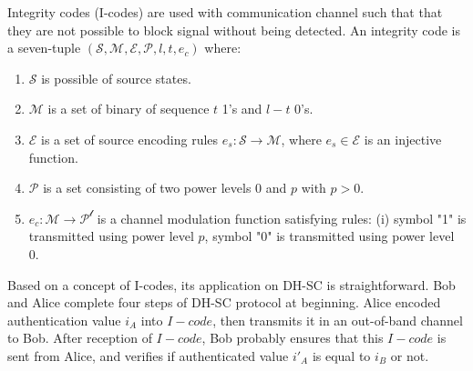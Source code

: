 Integrity codes (I-codes) are used with communication channel such that that they are not possible to block signal without being detected. An integrity code is a seven-tuple $(\mathcal{S},\mathcal{M},\mathcal{E},\mathcal{P},l,t,e_c)$ where:
\begin{enumerate}
\item $\mathcal{S}$ is possible of source states. 
\item $\mathcal{M}$ is a set of binary of sequence $t$ 1's and $l-t$ 0's. 
\item $\mathcal{E}$ is a set of source encoding rules $e_s: \mathcal{S} \rightarrow \mathcal{M}$, where $e_s \in \mathcal{E}$ is an injective function. 
\item $\mathcal{P}$ is a set consisting of two power levels 0 and $p$ with $p > 0$.
\item $e_c:\mathcal{M} \rightarrow \mathcal{P^l}$ is a channel modulation function satisfying rules: (i) symbol "1" is transmitted using power level $p$, symbol "0" is transmitted using power level 0. 
\end{enumerate} 

Based on a concept of I-codes, its application on DH-SC is straightforward. Bob and Alice complete four steps of DH-SC protocol at beginning. Alice encoded authentication value $i_A$ into $I-code$, then transmits it in an out-of-band channel to Bob. After reception of $I-code$, Bob probably ensures that this $I-code$ is sent from Alice, and verifies if authenticated value $i'_A$ is equal to $i_B$ or not. 
 
